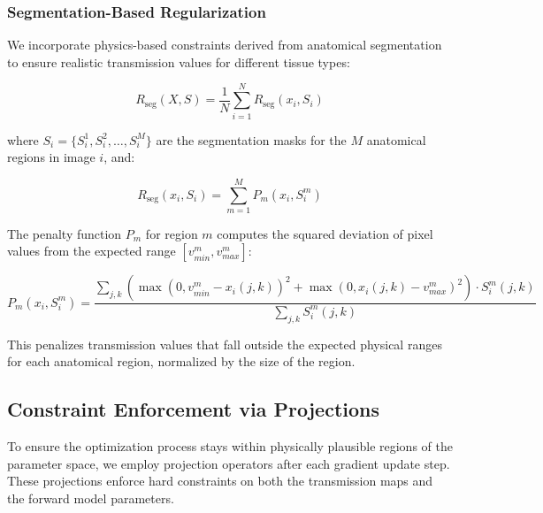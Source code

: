 \documentclass[nomenclature, english, bibtex]{kththesis}
\numberwithin{listing}{chapter}
\begin{document}

\subsubsection{Segmentation-Based Regularization}
We incorporate physics-based constraints derived from anatomical segmentation to ensure realistic transmission values for different tissue types:

\begin{equation}
R_{\text{seg}}(X, S) = \frac{1}{N} \sum_{i=1}^N R_{\text{seg}}(x_i, S_i)
\end{equation}

where $S_i = \{S_i^1, S_i^2, \ldots, S_i^M\}$ are the segmentation masks for the $M$ anatomical regions in image $i$, and:

\begin{equation}
R_{\text{seg}}(x_i, S_i) = \sum_{m=1}^{M} P_m(x_i, S_i^m)
\end{equation}

The penalty function $P_m$ for region $m$ computes the squared deviation of pixel values from the expected range $[v_{min}^m, v_{max}^m]$:

\begin{equation}
P_m(x_i, S_i^m) = \frac{\sum_{j, k} \left( \max(0, v_{min}^m - x_i(j,k))^2 + \max(0, x_i(j,k) - v_{max}^m)^2 \right) \cdot S_i^m(j,k)}{\sum_{j, k} S_i^m(j,k)}
\end{equation}

This penalizes transmission values that fall outside the expected physical ranges for each anatomical region, normalized by the size of the region.

\subsection{Constraint Enforcement via Projections}
To ensure the optimization process stays within physically plausible regions of the parameter space, we employ projection operators after each gradient update step. These projections enforce hard constraints on both the transmission maps and the forward model parameters.
\end{document}
